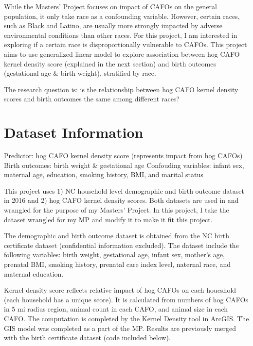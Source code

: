 \documentclass[
  12pt,
]{article}
\begin{document}
While the Masters' Project focuses on impact of CAFOs on the general
population, it only take race as a confounding variable. However,
certain races, such as Black and Latino, are usually more strongly
impacted by adverse environmental conditions than other races. For this
project, I am interested in exploring if a certain race is
disproportionally vulnerable to CAFOs. This project aims to use
generalized linear model to explore association between hog CAFO kernel
density score (explained in the next section) and birth outcomes
(gestational age \& birth weight), stratified by race.

The research question is: is the relationship between hog CAFO kernel
density scores and birth outcomes the same among different races?

\newpage

\hypertarget{dataset-information}{%
\section{Dataset Information}\label{dataset-information}}

Predictor: hog CAFO kernel density score (represents impact from hog
CAFOs) Birth outcomes: birth weight \& gestational age Confouding
variables: infant sex, maternal age, education, smoking history, BMI,
and marital status

This project uses 1) NC household level demographic and birth outcome
dataset in 2016 and 2) hog CAFO kernel density scores. Both datasets are
used in and wrangled for the purpose of my Masters' Project. In this
project, I take the dataset wrangled for my MP and modify it to make it
fit this project.

The demographic and birth outcome dataset is obtained from the NC birth
certificate dataset (confidential information excluded). The dataset
include the following variables: birth weight, gestational age, infant
sex, mother's age, prenatal BMI, smoking history, prenatal care index
level, naternal race, and maternal education.

Kernel density score reflects relative impact of hog CAFOs on each
houeshold (each household has a unique score). It is calculated from
numbers of hog CAFOs in 5 mi radius region, animal count in each CAFO,
and animal size in each CAFO. The computation is completed by the Kernel
Density tool in ArcGIS. The GIS model was completed as a part of the MP.
Results are previously merged with the birth certificate dataset (code
included below).
\end{document}
